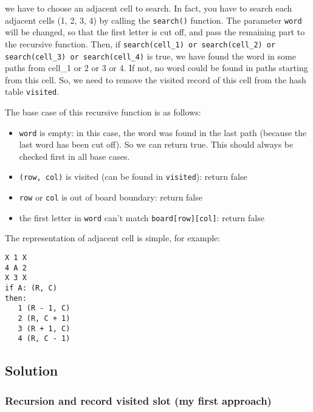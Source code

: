 \documentclass[11pt]{article}
\begin{document}
we have to choose an adjacent cell to search. In fact, you have to search each adjacent cells (1, 2, 3, 4) by calling the \texttt{search()} function. The parameter \texttt{word} will be changed, so that the first letter is cut off, and pass the remaining part to the recursive function. Then, if \texttt{search(cell\_1) or search(cell\_2) or search(cell\_3) or search(cell\_4)} is true, we have found the word in some paths from cell\_1 or 2 or 3 or 4. If not, no word could be found in paths starting from this cell. So, we need to remove the visited record of this cell from the hash table \texttt{visited}.

The base case of this recursive function is as follows:
\begin{itemize}
\item \texttt{word} is empty: in this case, the word was found in the last path (because the last word has been cut off). So we can return true. This should always be checked first in all base cases.
\item \texttt{(row, col)} is visited (can be found in \texttt{visited}): return false
\item \texttt{row} or \texttt{col} is out of board boundary: return false
\item the first letter in \texttt{word} can't match \texttt{board[row][col]}: return false
\end{itemize}

The representation of adjacent cell is simple, for example:
\begin{Verbatim}[frame=single]
X 1 X
4 A 2
X 3 X
if A: (R, C)
then:
   1 (R - 1, C)
   2 (R, C + 1)
   3 (R + 1, C)
   4 (R, C - 1)
\end{Verbatim}

\subsection{Solution}
\label{sec:org361d6bd}
\subsubsection{Recursion and record visited slot (my first approach)}
\label{sec:org05ffb90}
\end{document}
